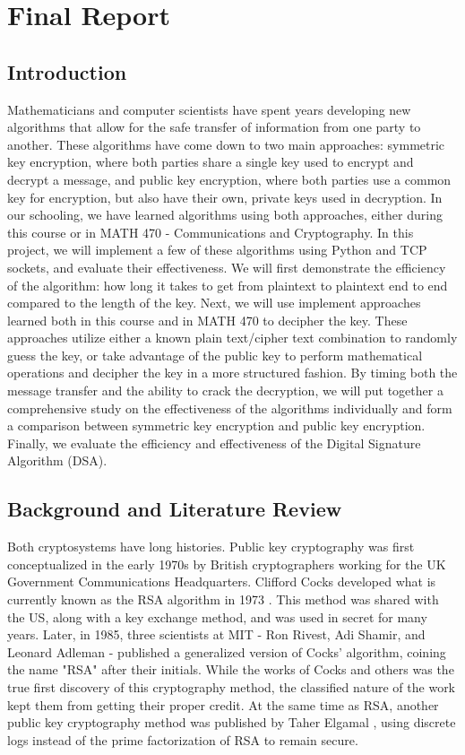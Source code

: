 \documentclass[12pt]{report}
\begin{document}
\chapter{Final Report}
\section{Introduction}
Mathematicians and computer scientists have spent years developing new algorithms that allow for the safe transfer of information from one party to another.
These algorithms have come down to two main approaches: symmetric key encryption, where both parties share a single key used to encrypt and decrypt a message,
and public key encryption, where both parties use a common key for encryption, but also have their own, private keys used in decryption. In our schooling, we
have learned algorithms using both approaches, either during this course or in MATH 470 - Communications and Cryptography. In this project, we will implement a few
of these algorithms using Python and TCP sockets, and evaluate their effectiveness. We will first demonstrate the efficiency of the algorithm: how long it
takes to get from plaintext to plaintext end to end compared to the length of the key. Next, we will use implement approaches learned both in this course and
in MATH 470 to decipher the key. These approaches utilize either a known plain text/cipher text combination to randomly guess the key, or take advantage of the
public key to perform mathematical operations and decipher the key in a more structured fashion. By timing both the message transfer and the ability to crack the
decryption, we will put together a comprehensive study on the effectiveness of the algorithms individually and form a comparison between symmetric key encryption
and public key encryption. Finally, we evaluate the efficiency and effectiveness of the Digital Signature Algorithm (DSA).

\section{Background and Literature Review}
Both cryptosystems have long histories. Public key cryptography was first conceptualized in the early 1970s by British cryptographers working for the UK Government
Communications Headquarters. Clifford Cocks developed what is currently known as the RSA algorithm in 1973 \cite{class}. This method was shared with the US, along
with a key exchange method, and was used in secret for many years. Later, in 1985, three scientists at MIT - Ron Rivest, Adi Shamir, and Leonard Adleman - published
a generalized version of Cocks' algorithm, coining the name "RSA" after their initials. While the works of Cocks and others was the true first discovery of this
cryptography method, the classified nature of the work kept them from getting their proper credit. At the same time as RSA, another public key cryptography method
was published by Taher Elgamal \cite{elgamal}, using discrete logs instead of the prime factorization of RSA to remain secure.
\end{document}
